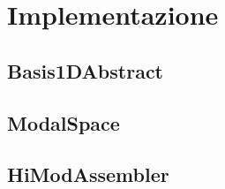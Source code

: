 \section{Implementazione}
\subsection{Basis1DAbstract}
\subsection{ModalSpace}
\subsection{HiModAssembler}